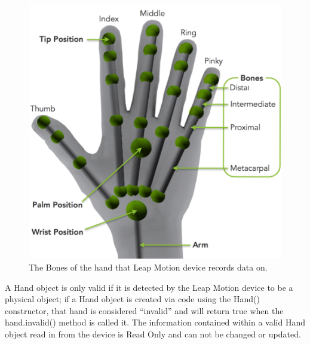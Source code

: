 \begin{figure}[th]
\centering
\includegraphics[scale=0.5]{Figures/handBones.png}
\caption[Hand Bone Model]{The Bones of the hand that Leap Motion device records data on. }
\label{fig:HandBones}
\end{figure}


A Hand object is only valid if it is detected by the Leap Motion device to be a physical object; if a Hand object is created via code using the Hand() constructor, that hand is considered “invalid” and will return true when the hand.invalid() method is called it. The information contained within a valid Hand object read in from the device is Read Only and can not be changed or updated. 

